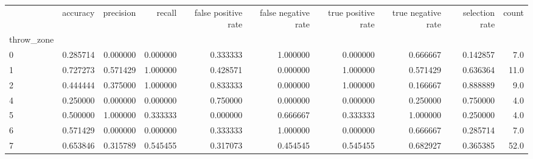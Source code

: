 \begin{tabular}{lrrrrrrrrr}
\toprule
{} &  accuracy &  precision &    recall &  false positive rate &  false negative rate &  true positive rate &  true negative rate &  selection rate &  count \\
throw\_zone &           &            &           &                      &                      &                     &                     &                 &        \\
\midrule
0          &  0.285714 &   0.000000 &  0.000000 &             0.333333 &             1.000000 &            0.000000 &            0.666667 &        0.142857 &    7.0 \\
1          &  0.727273 &   0.571429 &  1.000000 &             0.428571 &             0.000000 &            1.000000 &            0.571429 &        0.636364 &   11.0 \\
2          &  0.444444 &   0.375000 &  1.000000 &             0.833333 &             0.000000 &            1.000000 &            0.166667 &        0.888889 &    9.0 \\
4          &  0.250000 &   0.000000 &  0.000000 &             0.750000 &             0.000000 &            0.000000 &            0.250000 &        0.750000 &    4.0 \\
5          &  0.500000 &   1.000000 &  0.333333 &             0.000000 &             0.666667 &            0.333333 &            1.000000 &        0.250000 &    4.0 \\
6          &  0.571429 &   0.000000 &  0.000000 &             0.333333 &             1.000000 &            0.000000 &            0.666667 &        0.285714 &    7.0 \\
7          &  0.653846 &   0.315789 &  0.545455 &             0.317073 &             0.454545 &            0.545455 &            0.682927 &        0.365385 &   52.0 \\
\bottomrule
\end{tabular}
